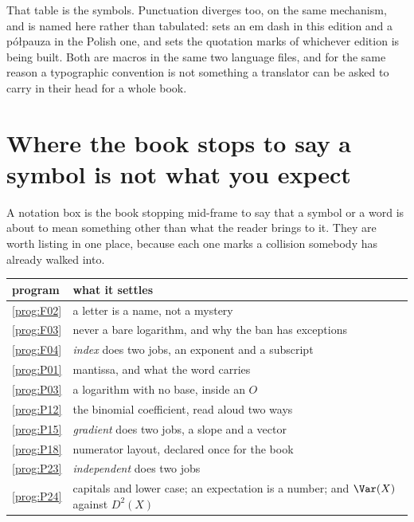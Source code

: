 That table is the symbols. Punctuation diverges too, on the same mechanism, and
is named here rather than tabulated:  sets an em dash
in this edition and a półpauza in the Polish one, and
 sets the quotation marks of whichever edition is
being built. Both are macros in the same two language files, and for the same
reason \dash{} a typographic convention is not something a translator can be
asked to carry in their head for a whole book.

\section{Where the book stops to say a symbol is not what you expect}
\label{sec:D-boxes}

A notation box is the book stopping mid-frame to say that a symbol or a word is
about to mean something other than what the reader brings to it. They are worth
listing in one place, because each one marks a collision somebody has already
walked into.

\begin{center}
\begin{tabularx}{\linewidth}{@{}lX@{}}
\toprule
\textbf{program} & \textbf{what it settles} \\
\midrule
\ref{prog:F02} & a letter is a name, not a mystery \\
\ref{prog:F03} & never a bare logarithm, and why the ban has exceptions \\
\ref{prog:F04} & \emph{index} does two jobs, an exponent and a subscript \\
\ref{prog:P01} & mantissa, and what the word carries \\
\ref{prog:P03} & a logarithm with no base, inside an $O$ \\
\ref{prog:P12} & the binomial coefficient, read aloud two ways \\
\ref{prog:P15} & \emph{gradient} does two jobs, a slope and a vector \\
\ref{prog:P18} & numerator layout, declared once for the book \\
\ref{prog:P23} & \emph{independent} does two jobs \\
\ref{prog:P24} & capitals and lower case; an expectation is a number; and
                 $\Var(X)$ against $D^{2}(X)$ \\
\bottomrule
\end{tabularx}
\end{center}

